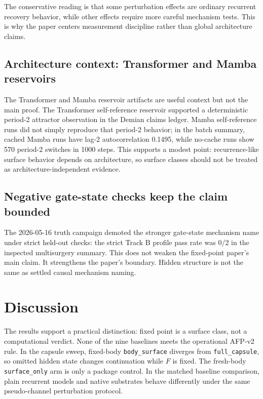 \documentclass[11pt]{article}
\begin{document}
The conservative reading is that some perturbation effects are ordinary
recurrent recovery behavior, while other effects require more careful
mechanism tests. This is why the paper centers measurement discipline rather
than global architecture claims.

\subsection{Architecture context: Transformer and Mamba reservoirs}

The Transformer and Mamba reservoir artifacts are useful context but not the
main proof. The Transformer self-reference reservoir supported a deterministic
period-2 attractor observation in the Demian claims ledger. Mamba
self-reference runs did not simply reproduce that period-2 behavior; in the
batch summary, cached Mamba runs have lag-2 autocorrelation 0.1495, while
no-cache runs show 570 period-2 switches in 1000 steps. This supports a
modest point: recurrence-like surface behavior depends on architecture, so
surface classes should not be treated as architecture-independent evidence.

\subsection{Negative gate-state checks keep the claim bounded}

The 2026-05-16 truth campaign demoted the stronger gate-state mechanism name
under strict held-out checks: the strict Track B profile pass rate was 0/2 in
the inspected multisurgery summary. This does not weaken the fixed-point
paper's main claim. It strengthens the paper's boundary. Hidden structure is
not the same as settled causal mechanism naming.

\section{Discussion}

The results support a practical distinction: fixed point is a surface class,
not a computational verdict. None of the nine baselines meets the operational
AFP-v2 rule. In the capsule sweep, fixed-body \texttt{body\_surface} diverges from
\texttt{full\_capsule}, so omitted hidden state changes continuation while
$F$ is fixed. The fresh-body \texttt{surface\_only} arm is only a package
control. In the matched baseline comparison, plain recurrent models and native
substrates behave differently under the same pseudo-channel perturbation
protocol.
\end{document}
